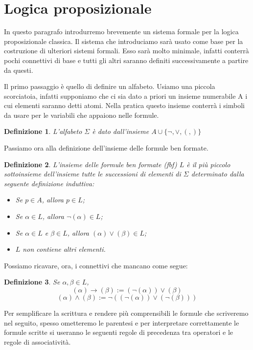 \documentclass[a4paper, 12pt]{article}
\newtheorem{definition}{Definizione}
\begin{document}
\section{Logica proposizionale}
In questo paragrafo introdurremo brevemente un sistema formale per la logica proposizionale classica.
Il sistema che introduciamo sarà usato come base per la costruzione di ulteriori sistemi formali.
Esso sarà molto minimale, infatti conterrà pochi connettivi di base
e tutti gli altri saranno definiti successivamente a partire da questi.

Il primo passaggio è quello di definire un alfabeto. Usiamo una piccola scorciatoia,
infatti supponiamo che ci sia dato a priori un insieme numerabile A i cui elementi saranno detti atomi.
Nella pratica questo insieme conterrà i simboli da usare per le variabili che appaiono nelle formule.

\begin{definition}
L'alfabeto $\Sigma$ è dato dall'insieme $A \cup \{\neg, \vee, (, ) \}$
\end{definition}

Passiamo ora alla definizione dell'insieme delle formule ben formate.

\begin{definition}
L'insieme delle formule ben formate (fbf) $L$ è il più piccolo sottoinsieme dell'insieme tutte le successioni
di elementi di $\Sigma$ determinato dalla seguente definizione induttiva:
\begin{itemize}
\item Se $p \in A$, allora $p \in L$;
\item Se $\alpha \in L$, allora $\neg (\alpha) \in L$;
\item Se $\alpha \in L$ e $\beta \in L$, allora $(\alpha) \vee (\beta) \in L$;
\item $L$ non contiene altri elementi.
\end{itemize}
\end{definition}

Possiamo ricavare, ora, i connettivi che mancano come segue:
\begin{definition}
Se $\alpha, \beta \in L$,
$$(\alpha) \rightarrow (\beta) := (\neg (\alpha)) \vee (\beta)$$
$$(\alpha) \wedge (\beta) := \neg ((\neg (\alpha)) \vee (\neg (\beta)))$$
\end{definition}

Per semplificare la scrittura e rendere più comprensibili le formule che scriveremo
nel seguito, spesso ometteremo le parentesi e per interpretare correttamente
le formule scritte si useranno le seguenti regole di precedenza tra operatori
e le regole di associatività.
\end{document}
